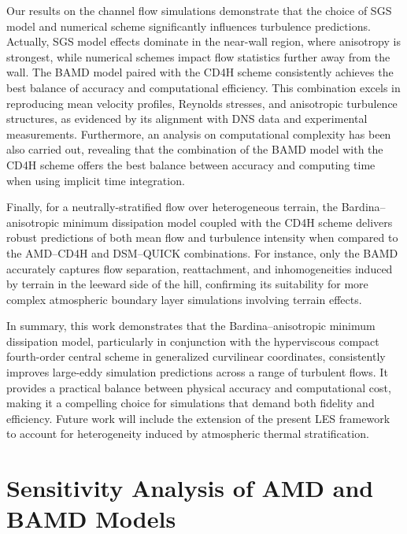 \documentclass[final,3p]{elsarticle}
\begin{document}
Our results on the channel flow simulations demonstrate that the choice of SGS model and numerical scheme significantly influences turbulence predictions. Actually, SGS model effects dominate in the near-wall region, where anisotropy is strongest, while numerical schemes impact flow statistics further away from the wall. The BAMD model paired with the CD4H scheme consistently achieves the best balance of accuracy and computational efficiency. This combination excels in reproducing mean velocity profiles, Reynolds stresses, and anisotropic turbulence structures, as evidenced by its alignment with DNS data and experimental measurements. Furthermore, an analysis on computational complexity  has been also carried out, revealing that the combination of the BAMD model with the CD4H scheme offers the best balance between accuracy and computing time when using implicit time integration.

Finally, for a neutrally-stratified flow over heterogeneous terrain, the Bardina--anisotropic minimum dissipation model coupled with the CD4H scheme delivers robust predictions of both mean flow and turbulence intensity when compared to the AMD--CD4H and DSM--QUICK combinations. For instance, only the BAMD accurately captures flow separation, reattachment, and inhomogeneities induced by terrain in the leeward side of the hill, confirming its suitability for more complex atmospheric boundary layer simulations involving terrain effects.

In summary, this work demonstrates that the Bardina--anisotropic minimum dissipation model, particularly in conjunction with the hyperviscous compact fourth-order central scheme in generalized curvilinear coordinates, consistently improves large-eddy simulation predictions across a range of turbulent flows. It provides a practical balance between physical accuracy and computational cost, making it a compelling choice for simulations that demand both fidelity and efficiency. Future work will include the extension of the present LES framework to account for heterogeneity induced by atmospheric thermal stratification.

\clearpage
\appendix
\section{Sensitivity Analysis of AMD and BAMD Models}
\label{app:sensitivityStudy}
\end{document}
